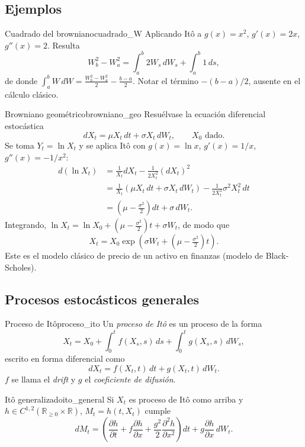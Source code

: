 \documentclass[11pt, a4paper]{article}
\begin{document}
\subsection{Ejemplos}

\begin{ejemplo}{Cuadrado del browniano}{cuadrado_W}
Aplicando Itô a $g(x) = x^2$, $g'(x) = 2x$, $g''(x) = 2$. Resulta
$$ W_b^2 - W_a^2 = \int_a^b 2 W_s \, dW_s + \int_a^b 1 \, ds, $$
de donde $\int_a^b W \, dW = \tfrac{W_b^2 - W_a^2}{2} - \tfrac{b - a}{2}$. Notar el término
$-(b-a)/2$, ausente en el cálculo clásico.
\end{ejemplo}

\begin{ejemplo}{Browniano geométrico}{browniano_geo}
Resuélvase la ecuación diferencial estocástica
$$ dX_t = \mu X_t \, dt + \sigma X_t \, dW_t, \qquad X_0 \text{ dado}. $$
Se toma $Y_t = \ln X_t$ y se aplica Itô con $g(x) = \ln x$, $g'(x) = 1/x$, $g''(x) = -1/x^2$:
\begin{align*}
d(\ln X_t) &= \frac{1}{X_t} dX_t - \frac{1}{2 X_t^2} (dX_t)^2 \\
&= \frac{1}{X_t} (\mu X_t \, dt + \sigma X_t \, dW_t) - \frac{1}{2 X_t^2} \sigma^2 X_t^2 \, dt \\
&= \left(\mu - \tfrac{\sigma^2}{2}\right) dt + \sigma \, dW_t.
\end{align*}
Integrando, $\ln X_t = \ln X_0 + (\mu - \tfrac{\sigma^2}{2}) t + \sigma W_t$, de modo que
$$ X_t = X_0 \exp\!\left(\sigma W_t + \left(\mu - \tfrac{\sigma^2}{2}\right) t\right). $$
Este es el modelo clásico de precio de un activo en finanzas (modelo de Black-Scholes).
\end{ejemplo}

\newpage

\subsection{Procesos estocásticos generales}

\begin{definicion}{Proceso de Itô}{proceso_ito}
Un \emph{proceso de Itô} es un proceso de la forma
$$ X_t = X_0 + \int_0^t f(X_s, s) \, ds + \int_0^t g(X_s, s) \, dW_s, $$
escrito en forma diferencial como
$$ dX_t = f(X_t, t) \, dt + g(X_t, t) \, dW_t. $$
$f$ se llama el \emph{drift} y $g$ el \emph{coeficiente de difusión}.
\end{definicion}

\begin{teorema}{Itô generalizado}{ito_general}
Si $X_t$ es proceso de Itô como arriba y $h \in C^{1,2}(\mathbb{R}_{\ge 0} \times \mathbb{R})$,
$M_t = h(t, X_t)$ cumple
$$ dM_t = \left(\frac{\partial h}{\partial t} + f \frac{\partial h}{\partial x} + \frac{g^2}{2}
\frac{\partial^2 h}{\partial x^2}\right) dt + g \frac{\partial h}{\partial x} \, dW_t. $$
\end{teorema}
\end{document}
